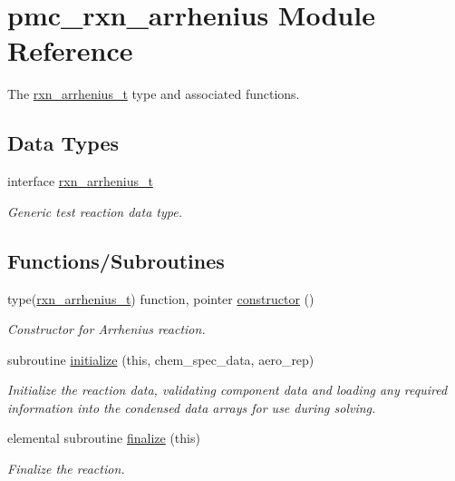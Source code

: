 \hypertarget{namespacepmc__rxn__arrhenius}{}\section{pmc\+\_\+rxn\+\_\+arrhenius Module Reference}
\label{namespacepmc__rxn__arrhenius}


The \mbox{\hyperlink{structpmc__rxn__arrhenius_1_1rxn__arrhenius__t}{rxn\+\_\+arrhenius\+\_\+t}} type and associated functions.  


\subsection*{Data Types}
\begin{DoxyCompactItemize}
\item 
interface \mbox{\hyperlink{structpmc__rxn__arrhenius_1_1rxn__arrhenius__t}{rxn\+\_\+arrhenius\+\_\+t}}
\begin{DoxyCompactList}\small\item\em Generic test reaction data type. \end{DoxyCompactList}\end{DoxyCompactItemize}
\subsection*{Functions/\+Subroutines}
\begin{DoxyCompactItemize}
\item 
type(\mbox{\hyperlink{structpmc__rxn__arrhenius_1_1rxn__arrhenius__t}{rxn\+\_\+arrhenius\+\_\+t}}) function, pointer \mbox{\hyperlink{namespacepmc__rxn__arrhenius_a01eb485a07b0ebe221eafbd3895e7bb9}{constructor}} ()
\begin{DoxyCompactList}\small\item\em Constructor for Arrhenius reaction. \end{DoxyCompactList}\item 
subroutine \mbox{\hyperlink{namespacepmc__rxn__arrhenius_a98fac0a13ca490d21f4b3c0049645c09}{initialize}} (this, chem\+\_\+spec\+\_\+data, aero\+\_\+rep)
\begin{DoxyCompactList}\small\item\em Initialize the reaction data, validating component data and loading any required information into the condensed data arrays for use during solving. \end{DoxyCompactList}\item 
elemental subroutine \mbox{\hyperlink{namespacepmc__rxn__arrhenius_a88b969b655e039c6d75e80ff1a3cf77f}{finalize}} (this)
\begin{DoxyCompactList}\small\item\em Finalize the reaction. \end{DoxyCompactList}\end{DoxyCompactItemize}


